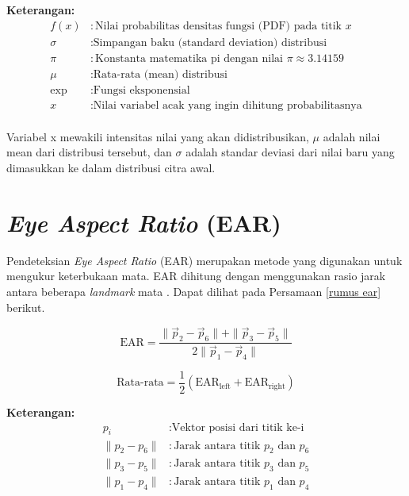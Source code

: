     \textbf{Keterangan:}
      \begin{align*}
        f(x) & : \text{Nilai probabilitas densitas fungsi (PDF) pada titik } x \\
        \sigma & : \text{Simpangan baku (standard deviation) distribusi} \\
        \pi & : \text{Konstanta matematika pi dengan nilai } \pi \approx 3.14159\\
        \mu & : \text{Rata-rata (mean) distribusi} \\
        \exp & : \text{Fungsi eksponensial} \\
        x & : \text{Nilai variabel acak yang ingin dihitung probabilitasnya} \\
    \end{align*}
    


    
    Variabel x mewakili intensitas nilai yang akan didistribusikan, $\mu$ adalah nilai mean dari distribusi tersebut, dan $\sigma$ adalah standar deviasi dari nilai baru yang dimasukkan ke dalam distribusi citra awal.



\section{\textit{Eye Aspect Ratio} (EAR)}

    Pendeteksian \textit{Eye Aspect Ratio }(EAR) merupakan metode yang digunakan untuk mengukur keterbukaan mata. EAR dihitung dengan menggunakan rasio jarak antara beberapa \textit{landmark} mata \cite{electronics11193183}. Dapat dilihat pada Persamaan \ref{rumus ear} berikut.

    
    \begin{equation}
    \label{rumus ear}
    \text{EAR} = \frac{{\| \vec{p}_2 - \vec{p}_6 \| + \| \vec{p}_3 - \vec{p}_5 \|}}{{2 \| \vec{p}_1 - \vec{p}_4 \|}}
    \end{equation}

    \begin{equation}
    \text{Rata-rata} = \frac{1}{2}(\text{EAR}_{\text{left}} + \text{EAR}_{\text{right}})
    \end{equation}



    \textbf{Keterangan:}
    \begin{align*}
        p_i & : \text{Vektor posisi dari titik ke-i}\\
        \|p_2 - p_6\| & : \text{Jarak antara titik $p_2$ dan $p_6$}\\
        \|p_3 - p_5\| & : \text{Jarak antara titik $p_3$ dan $p_5$}\\
        \|p_1 - p_4\| & : \text{Jarak antara titik $p_1$ dan $p_4$}\\
    \end{align*}

